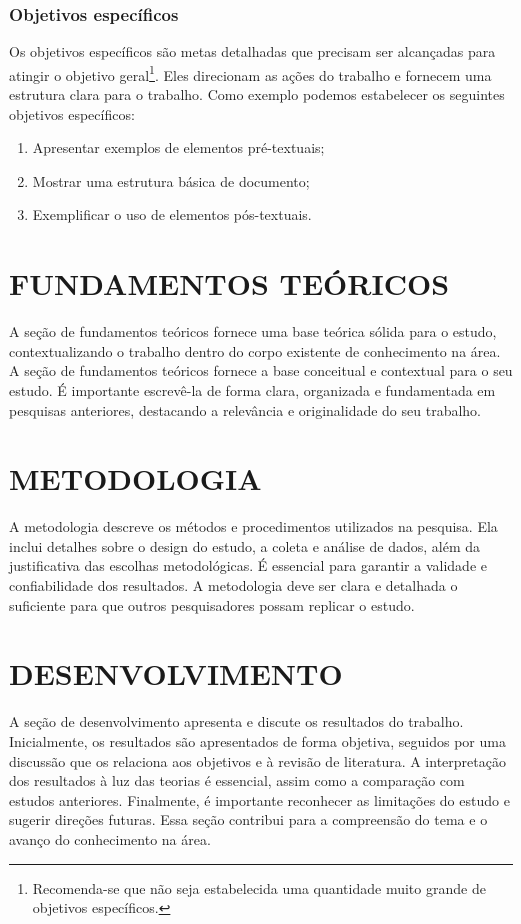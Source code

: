 \documentclass[artigo]{iftex2024}
\begin{document}
\subsubsection{Objetivos específicos}

Os objetivos específicos são metas detalhadas que precisam ser alcançadas para atingir o objetivo geral\footnote{Recomenda-se que não seja estabelecida uma quantidade muito grande de objetivos específicos.}.
Eles direcionam as ações do trabalho e fornecem uma estrutura clara para o trabalho.
Como exemplo podemos estabelecer os seguintes objetivos específicos:
\begin{enumerate}
 \item Apresentar exemplos de elementos pré-textuais;
 \item Mostrar uma estrutura básica de documento;
 \item Exemplificar o uso de elementos pós-textuais.
\end{enumerate}

\section{FUNDAMENTOS TEÓRICOS}

A seção de fundamentos teóricos fornece uma base teórica sólida para o estudo, contextualizando o trabalho dentro do corpo existente de conhecimento na área.
A seção de fundamentos teóricos fornece a base conceitual e contextual para o seu estudo.
É importante escrevê-la de forma clara, organizada e fundamentada em pesquisas anteriores, destacando a relevância e originalidade do seu trabalho.

\section{METODOLOGIA}

A metodologia descreve os métodos e procedimentos utilizados na pesquisa.
Ela inclui detalhes sobre o design do estudo, a coleta e análise de dados, além da justificativa das escolhas metodológicas.
É essencial para garantir a validade e confiabilidade dos resultados.
A metodologia deve ser clara e detalhada o suficiente para que outros pesquisadores possam replicar o estudo.

\section{DESENVOLVIMENTO}

A seção de desenvolvimento apresenta e discute os resultados do trabalho.
Inicialmente, os resultados são apresentados de forma objetiva, seguidos por uma discussão que os relaciona aos objetivos e à revisão de literatura.
A interpretação dos resultados à luz das teorias é essencial, assim como a comparação com estudos anteriores.
Finalmente, é importante reconhecer as limitações do estudo e sugerir direções futuras.
Essa seção contribui para a compreensão do tema e o avanço do conhecimento na área.
\end{document}
